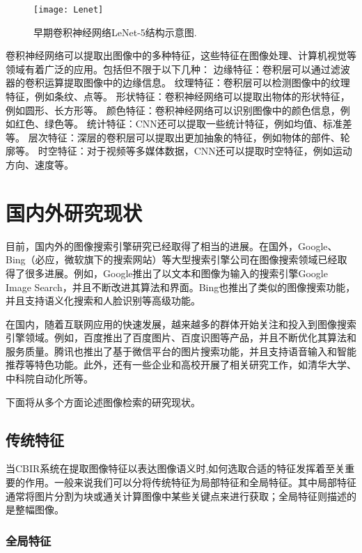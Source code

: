 \documentclass[bachelor_p]{hdu-thesis}
\begin{document}
\begin{figure}[!htb]
  \centering
  \texttt{[image: Lenet]}
  \caption{早期卷积神经网络LeNet-5结构示意图.}
  \label{fig_LENET}
\end{figure}

卷积神经网络可以提取出图像中的多种特征，这些特征在图像处理、计算机视觉等领域有着广泛的应用。包括但不限于以下几种：
边缘特征：卷积层可以通过滤波器的卷积运算提取图像中的边缘信息。
纹理特征：卷积层可以检测图像中的纹理特征，例如条纹、点等。
形状特征：卷积神经网络可以提取出物体的形状特征，例如圆形、长方形等。
颜色特征：卷积神经网络可以识别图像中的颜色信息，例如红色、绿色等。
统计特征：CNN还可以提取一些统计特征，例如均值、标准差等。
层次特征：深层的卷积层可以提取出更加抽象的特征，例如物体的部件、轮廓等。
时空特征：对于视频等多媒体数据，CNN还可以提取时空特征，例如运动方向、速度等。


\section{国内外研究现状}

目前，国内外的图像搜索引擎研究已经取得了相当的进展。在国外，Google、Bing（必应，微软旗下的搜索网站）等大型搜索引擎公司在图像搜索领域已经取得了很多进展。例如，Google推出了以文本和图像为输入的搜索引擎Google Image Search，并且不断改进其算法和界面。Bing也推出了类似的图像搜索功能，并且支持语义化搜索和人脸识别等高级功能。

在国内，随着互联网应用的快速发展，越来越多的群体开始关注和投入到图像搜索引擎领域。例如，百度推出了百度图片、百度识图等产品，并且不断优化其算法和服务质量。腾讯也推出了基于微信平台的图片搜索功能，并且支持语音输入和智能推荐等特色功能。此外，还有一些企业和高校开展了相关研究工作，如清华大学、中科院自动化所等。

下面将从多个方面论述图像检索的研究现状。

\subsection{传统特征}

当CBIR系统在提取图像特征以表达图像语义时,如何选取合适的特征发挥着至关重要的作用。一般来说我们可以分将传统特征为局部特征和全局特征。其中局部特征通常将图片分割为块或通关计算图像中某些关键点来进行获取；全局特征则描述的是整幅图像。

\subsubsection{全局特征}
\end{document}
